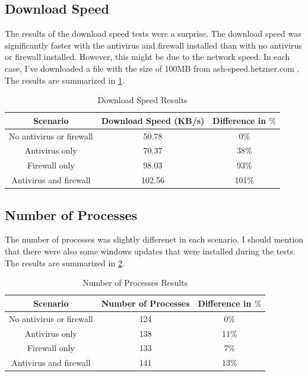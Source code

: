 \documentclass[runningheads,a4paper,english]{llncs}[2022/01/12]
\begin{document}
\subsection{Download Speed}\label{sec:download}

\par The results of the download speed tests were a surprise. The download
speed was significantly faster with the antivirus and firewall installed than
with no antivirus or firewall installed. However, this might be due to the
network speed. In each case, I've downloaded a file with the size of 100MB from
ash-speed.hetzner.com \cite{HetznerSpeed}. The results are summarized in
\cref{tab:download}.

\begin{table}[h]
\centering
  \begin{tabular}{|c|c|c|}
    \hline
    Scenario & Download Speed (KB/s) & Difference in $\%$ \\
    \hline
    No antivirus or firewall & 50.78 & 0\% \\
    Antivirus only & 70.37 & 38\% \\
    Firewall only & 98.03 & 93\% \\
    Antivirus and firewall & 102.56 & 101\% \\
    \hline
  \end{tabular}
  \caption{Download Speed Results}
  \label{tab:download}
\end{table}

\subsection{Number of Processes}\label{sec:processes}

\par The number of processes was slightly differenet in each scenario. I should
mention that there were also some windows updates that were installed during
the tests. The results are summarized in \cref{tab:processes}.

\begin{table}[h]
\centering
  \begin{tabular}{|c|c|c|}
    \hline
    Scenario & Number of Processes & Difference in $\%$ \\
    \hline
    No antivirus or firewall & 124 & 0\% \\
    Antivirus only & 138 &  11\% \\
    Firewall only & 133 & 7\% \\
    Antivirus and firewall & 141 & 13\% \\
    \hline
  \end{tabular}
  \caption{Number of Processes Results}
  \label{tab:processes}
\end{table}
\end{document}
